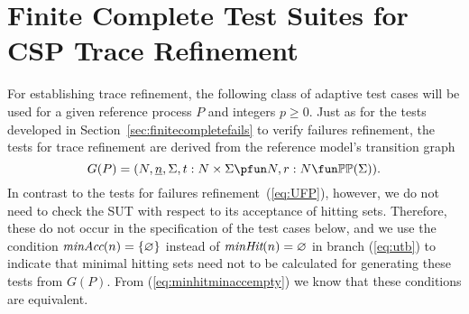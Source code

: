 \section{Finite Complete Test Suites for CSP Trace Refinement}
\label{sec:finitecomplete}

For establishing trace refinement, the following class of adaptive test cases
will be used for a given reference process $P$ and  integers $p \ge 0$.
Just as for the tests developed  in
Section~\ref{sec:finitecompletefails} to verify failures refinement,
the tests for trace refinement are
derived from the reference model's transition graph
$$
G(P) = ( N, \ii n, \Sigma, t : N\times\Sigma \pfun N, r : N \fun \mathbb{P}\mathbb{P}(\Sigma)).
$$
In contrast to the tests for failures refinement~(\ref{eq:UFP}), however, we
do not need to check the SUT with respect to its acceptance of hitting sets.
Therefore, these do not occur in the specification of the test cases below,
and we use the condition $\text{\it minAcc}(n) = \{ \varnothing \}$ instead of
$\text{\it minHit}(n) = \varnothing$ in branch (\ref{eq:utb}) 
to indicate that minimal hitting sets need not to
be calculated for generating these tests from $G(P)$. From
(\ref{eq:minhitminaccempty}) we know that these conditions are equivalent.


